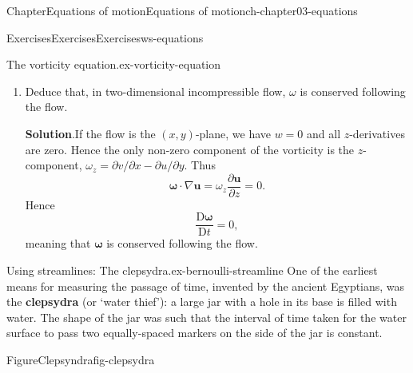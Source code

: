 \documentclass[oneside,10pt,]{book}
\newcommand{\blocktitlefont}{\relax}
\newcommand{\terminology}[1]{\textbf{#1}}
\numberwithin{equation}{section}
\newcommand{\DD}[2]{\frac{\mathrm{D}#1}{\mathrm{D}#2}}
\newcommand{\pd}[2]{\frac{\partial#1}{\partial#2}}
\newcommand{\bu}{\boldsymbol{u}}
\newcommand{\bomega}{\boldsymbol{\omega}}
\newcommand{\bk}{\boldsymbol{k}}
\begin{document}
\begin{chapterptx}{Chapter}{Equations of motion}{}{Equations of motion}{}{}{ch-chapter03-equations}
\begin{exercises-section}{Exercises}{Exercises}{}{Exercises}{}{}{ws-equations}
\begin{divisionexercise}{7}{The vorticity equation.}{}{ex-vorticity-equation}
\begin{enumerate}[font=\bfseries,label=(\alph*),ref=\alph*]
\begin{align*}
&+\bk\left(\pd{u}{x}\pd{v}{x}+\pd{v}{x}\pd{v}{y}+\pd{w}{x}\pd{v}{z}-\pd{u}{y}\pd{u}{x}-\pd{v}{y}\pd{u}{y}-\pd{w}{y}\pd{u}{z}\right),\\
=&\bu\cdot\nabla\bomega-\bomega\cdot\nabla\bu+\bomega\nabla\cdot\bu,\\
=&\bu\cdot\nabla\bomega-\bomega\cdot\nabla\bu,
\end{align*}
where the final equality follows from incompressibility. Hence,%
\begin{equation*}
\pd{\bomega}{t} + \bu\cdot\nabla\bomega - \bomega\cdot\nabla\bu = 0
\quad\Rightarrow\quad
\DD{\bomega}{t} = (\bomega \cdot \nabla)\bu,
\end{equation*}
as required.%
\item{}Deduce that, in two-dimensional incompressible flow, \(\omega\) is conserved following the flow.%
\par\smallskip%
\noindent\textbf{\blocktitlefont Solution}.\hypertarget{ex-vorticity-equation-4-2}{}\quad{}If the flow is the \((x,y)\)-plane, we have \(w=0\) and all \(z\)-derivatives are zero. Hence the only non-zero component of the vorticity is the \(z\)-component, \(\omega_z=\partial v/\partial x-\partial u/\partial y\). Thus%
\begin{equation*}
\bomega\cdot\nabla\bu=\omega_z\pd{\bu}{z}=0.
\end{equation*}
Hence%
\begin{equation*}
\DD{\bomega}{t} = 0,
\end{equation*}
meaning that \(\bomega\) is conserved following the flow.%
\end{enumerate}%
\end{divisionexercise}%
\begin{divisionexercise}{8}{Using streamlines: The clepsydra.}{}{ex-bernoulli-streamline}%
One of the earliest means for measuring the passage of time, invented by the ancient Egyptians, was the \terminology{clepsydra} (or ‘water thief’): a large jar with a hole in its base is filled with water. The shape of the jar was such that the interval of time taken for the water surface to pass two equally-spaced markers on the side of the jar is constant.%
 \begin{figureptx}{Figure}{Clepsyndra}{fig-clepsydra}{}%
\begin{image}{0.25}{0.5}{0.25}{}%

\end{image}
\end{figureptx}
\end{divisionexercise}
\end{exercises-section}
\end{chapterptx}
\end{document}

